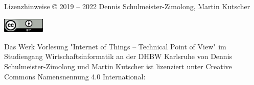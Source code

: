 {
    \tiny
    \begin{frame}{Lizenzhinweise}
            © 2019 -- 2022 Dennis Schulmeister-Zimolong, Martin Kutscher
            \medskip

            \medskip

            \includegraphics[width=2cm]{include/cc-by.png}
            \medskip

            Das Werk Vorlesung "Internet of Things – Technical Point of View" im Studiengang
            Wirtschaftsinformatik an der DHBW Karlsruhe von Dennis Schulmeister-Zimolong
            und Martin Kutscher ist lizenziert unter Creative Commons Namensnennung 4.0 International:
            \medskip

    \end{frame}
}
